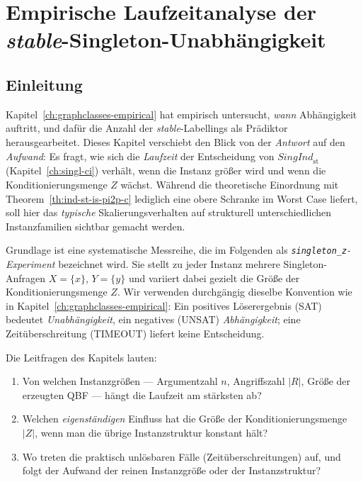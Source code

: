 \chapter{Empirische Laufzeitanalyse der \textit{stable}-Singleton-Unabh\"angigkeit}
\label{ch:singleton-z}

\section{Einleitung}
\label{sec:sz-einleitung}

Kapitel~\ref{ch:graphclasses-empirical} hat empirisch untersucht, \emph{wann}
Abh\"angigkeit auftritt, und daf\"ur die Anzahl der \textit{stable}-Labellings
als Pr\"adiktor herausgearbeitet. Dieses Kapitel verschiebt den Blick von der
\emph{Antwort} auf den \emph{Aufwand}: Es fragt, wie sich die \emph{Laufzeit}
der Entscheidung von \(\textit{SingInd}_{\mathrm{st}}\) (Kapitel~\ref{ch:singl-ci})
verh\"alt, wenn die Instanz gr\"o\ss er wird und wenn die Konditionierungsmenge
\(Z\) w\"achst. W\"ahrend die theoretische Einordnung mit
Theorem~\ref{th:ind-st-is-pi2p-c} lediglich eine obere Schranke im
Worst Case liefert, soll hier das \emph{typische} Skalierungsverhalten auf
strukturell unterschiedlichen Instanzfamilien sichtbar gemacht werden.

Grundlage ist eine systematische Messreihe, die im Folgenden als
\emph{\texttt{singleton\_z}-Experiment} bezeichnet wird. Sie stellt zu jeder
Instanz mehrere Singleton-Anfragen \(X=\{x\}\), \(Y=\{y\}\) und variiert dabei
gezielt die Gr\"o\ss e der Konditionierungsmenge \(Z\). Wir verwenden
durchg\"angig dieselbe Konvention wie in
Kapitel~\ref{ch:graphclasses-empirical}: Ein positives L\"oserergebnis (SAT)
bedeutet \emph{Unabh\"angigkeit}, ein negatives (UNSAT) \emph{Abh\"angigkeit};
eine Zeit\"uberschreitung (TIMEOUT) liefert keine Entscheidung.

Die Leitfragen des Kapitels lauten:
\begin{enumerate}
    \item Von welchen Instanzgr\"o\ss en --- Argumentzahl \(n\), Angriffszahl
    \(|R|\), Gr\"o\ss e der erzeugten QBF --- h\"angt die Laufzeit am
    st\"arksten ab?
    \item Welchen \emph{eigenst\"andigen} Einfluss hat die Gr\"o\ss e der
    Konditionierungsmenge \(|Z|\), wenn man die \"ubrige Instanzstruktur
    konstant h\"alt?
    \item Wo treten die praktisch unl\"osbaren F\"alle (Zeit\"uberschreitungen)
    auf, und folgt der Aufwand der reinen Instanzgr\"o\ss e oder der
    Instanzstruktur?
\end{enumerate}


